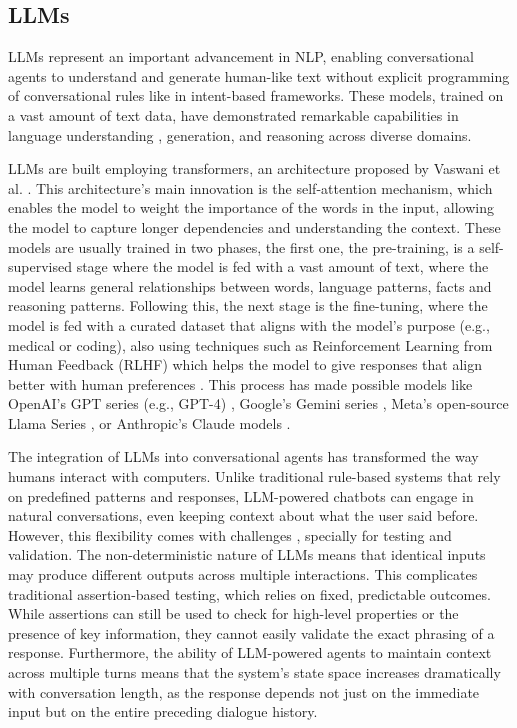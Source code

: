 \subsection{\aclp{LLM}}

\aclp{LLM} represent an important advancement in \acl{NLP},
enabling conversational agents to understand and generate human-like text
without explicit programming of conversational rules like in intent-based frameworks.
These models, trained on a vast amount of text data,
have demonstrated remarkable capabilities in
language understanding \autocite{liEnhancingNaturalLanguage2024}, generation, and reasoning across diverse domains.

\aclp{LLM} are built employing transformers,
an architecture proposed by Vaswani et al. \autocite{vaswaniAttentionAllYou2017}.
This architecture's main innovation is the self-attention mechanism,
which enables the model to weight the importance of the words in the input,
allowing the model to capture longer dependencies and understanding the context.
These models are usually trained in two phases,
the first one, the pre-training,
is a self-supervised stage where the model
is fed with a vast amount of text,
where the model learns
general relationships between words,
language patterns, facts and reasoning patterns.
Following this, the next stage is the fine-tuning,
where the model is fed with a curated dataset
that aligns with the model's purpose (e.g., medical or coding),
also using techniques such as
Reinforcement Learning from Human Feedback (RLHF)
which helps the model to give responses
that align better with human preferences
\autocite{zieglerFineTuningLanguageModels2020}.
This process has made possible models like
OpenAI's GPT series (e.g., GPT-4) \autocite{OpenAI2025},
Google's Gemini series \autocite{GoogleGemini},
Meta's open-source Llama Series \autocite{touvronLLaMAOpenEfficient2023},
or Anthropic's Claude models \autocite{ClaudeAnthropic}.


The integration of \acp{LLM} into conversational agents
has transformed the way humans interact with computers.
Unlike traditional rule-based systems that rely on predefined patterns and responses,
\ac{LLM}-powered chatbots can engage in natural conversations,
even keeping context about what the user said before.
However, this flexibility comes with challenges
\autocite{zamfirescu-pereiraHerdingAICats2023},
specially for testing and validation.
The non-deterministic nature of \acp{LLM} means that
identical inputs may produce different outputs across multiple interactions.
This complicates traditional assertion-based testing,
which relies on fixed, predictable outcomes.
While assertions can still be used
to check for high-level properties or the presence of key information,
they cannot easily validate the exact phrasing of a response.
Furthermore, the ability of \ac{LLM}-powered agents
to maintain context across multiple turns
means that the system's state space increases dramatically with conversation length,
as the response depends not just on the immediate input
but on the entire preceding dialogue history.

